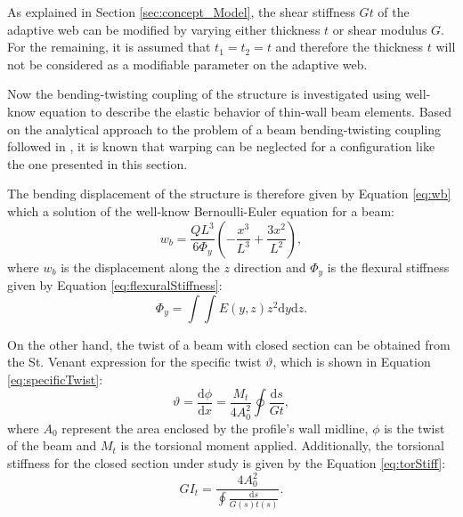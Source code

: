   As explained in Section \ref{sec:concept_Model}, the shear stiffness $G t$ of the adaptive web can be modified by varying either thickness $t$ or shear modulus $G$. For the remaining, it is assumed that $t_1 = t_2 = t$ and therefore the thickness $t$ will not be considered as a modifiable parameter on the adaptive web.

  Now the bending-twisting coupling of the structure is investigated using well-know equation to describe the elastic behavior of thin-wall beam elements. Based on the analytical approach to the problem of a beam bending-twisting coupling followed in \cite{Raither2013a}, it is known that warping can be neglected for a configuration like the one presented in this section.

  The bending displacement of the structure is therefore given by Equation \ref{eq:wb} which a solution of the well-know Bernoulli-Euler equation for a beam:
  \begin{equation}\label{eq:wb}
    w_b = \frac{Q L^3}{6 \Phi_y} \left( -\frac{x^3}{L^3} + \frac{3 x^2}{L^2} \right),
  \end{equation}
  where $w_b$ is the displacement along the $z$ direction and $\Phi_y$ is the flexural stiffness given by Equation \ref{eq:flexuralStiffness}:
  \begin{equation}\label{eq:flexuralStiffness}
    \Phi_y = \int \int E(y,z) z^2 \mathrm{d}y \mathrm{d}z.
  \end{equation}

  On the other hand, the twist of a beam with closed section can be obtained from the St. Venant expression for the specific twist $\vartheta$, which is shown in Equation \ref{eq:specificTwist}:
  \begin{equation}\label{eq:specificTwist}
    \vartheta = \frac{\mathrm{d} \phi}{\mathrm{d} x} = \frac{M_t}{4 A_0^2} \oint \frac{\mathrm{d} s}{Gt},
  \end{equation}
  where $A_0$ represent the area enclosed by the profile's wall midline, $\phi$ is the twist of the beam and $M_t$ is the torsional moment applied. Additionally, the torsional stiffness for the closed section under study is given by the Equation \ref{eq:torStiff}:
  \begin{equation}\label{eq:torStiff}
    G I_t = \frac{4 A_0^2}{\oint \frac{\mathrm{d} s}{G(s) t(s)}}.
  \end{equation}

